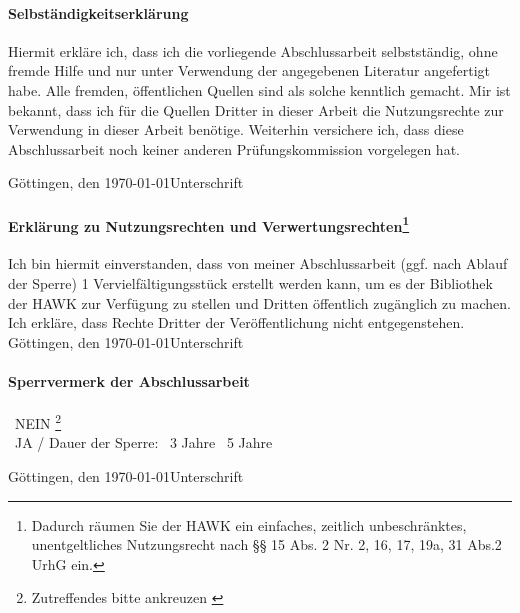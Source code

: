 

\paragraph*{Selbständigkeitserklärung}

Hiermit erkläre ich, dass ich die vorliegende Abschlussarbeit selbstständig, ohne fremde Hilfe und nur unter Verwendung der angegebenen Literatur angefertigt habe. Alle fremden, öffentlichen Quellen sind als solche kenntlich gemacht. Mir ist bekannt, dass ich für die Quellen Dritter in dieser Arbeit die Nutzungsrechte zur Verwendung in dieser Arbeit benötige. Weiterhin versichere ich, dass diese Abschlussarbeit noch keiner anderen Prüfungskommission vorgelegen hat.

Göttingen, den \today \hfill Unterschrift


\paragraph*{Erklärung zu Nutzungsrechten und Verwertungsrechten\footnote{Dadurch räumen Sie der HAWK ein einfaches, zeitlich unbeschränktes, unentgeltliches Nutzungsrecht nach §§ 15 Abs. 2 Nr. 2, 16, 17, 19a, 31 Abs.2 UrhG ein.}}

Ich bin hiermit einverstanden, dass von meiner Abschlussarbeit (ggf. nach Ablauf der Sperre) 1 Vervielfältigungsstück erstellt werden kann, um es der Bibliothek der HAWK zur Verfügung zu stellen und Dritten öffentlich zugänglich zu machen. Ich erkläre, dass Rechte Dritter der Veröffentlichung nicht entgegenstehen.\\

Göttingen, den \today \hfill Unterschrift

\paragraph*{Sperrvermerk der Abschlussarbeit}

\indent
\hspace{15mm}\Square~NEIN \footnote{Zutreffendes bitte ankreuzen \label{ftn:Zutreffendes}}  \\ 
\indent
\hspace{15mm}\Square~JA / Dauer der Sperre: \Square~3 Jahre \Square~5 Jahre

Göttingen, den \today \hfill Unterschrift